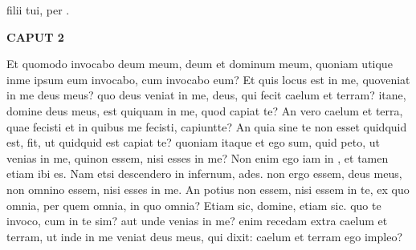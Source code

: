 \documentclass{article}
\begin{document}
  filii tui, per   . 
      \pend \vspace{0.1cm}    \vspace{0cm}
      \pstart  \begin{Large}\textbf{CAPUT 2}\end{Large}
    \pend
    \vspace{0.1cm}  
      \pstart Et quomodo invocabo deum meum, deum et dominum meum, quoniam utique inme ipsum eum invocabo, cum invocabo eum? Et quis locus est in me, quoveniat in me deus meus? quo deus veniat in me, deus, qui fecit caelum et terram? itane, domine deus meus, est quiquam in me, quod capiat te? An vero caelum et terra, quae fecisti et in quibus me fecisti, capiuntte? An quia sine te non esset  quidquid est, fit, ut quidquid est capiat te? quoniam itaque et ego sum, quid peto, ut venias in me, quinon essem, nisi esses in me? Non enim ego iam in , et tamen etiam ibi es. Nam etsi descendero in infernum, ades. non ergo essem, deus meus, non omnino essem, nisi esses in me. An potius non essem, nisi essem in te, ex quo omnia, per quem omnia, in quo omnia?   Etiam sic, domine, etiam sic. quo te invoco, cum in te sim? aut unde venias in me?   enim recedam extra caelum et terram, ut inde in me veniat deus meus, qui dixit: caelum et terram ego impleo?
      \pend \vspace{0.1cm}    \vspace{0cm}
\end{document}
